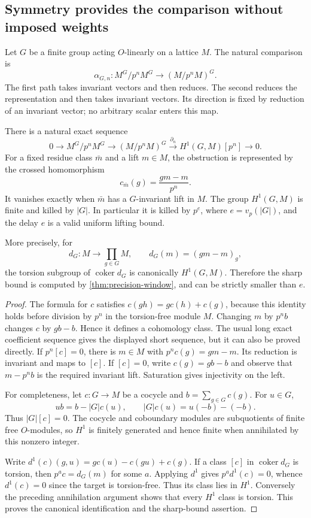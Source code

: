 \subsection{Symmetry provides the comparison without imposed weights}

Let $G$ be a finite group acting $O$-linearly on a lattice $M$. The natural comparison is
\[
 \alpha_{G,n}:M^G/p^nM^G\longrightarrow(M/p^nM)^G.
\]
The first path takes invariant vectors and then reduces. The second reduces the representation and then takes invariant vectors. Its direction is fixed by reduction of an invariant vector; no arbitrary scalar enters this map.

\begin{theorem}\label{thm:invariant-bockstein}
There is a natural exact sequence
\[
 \boxed{0\longrightarrow M^G/p^nM^G\longrightarrow(M/p^nM)^G
 \xrightarrow{\partial_n}H^1(G,M)[p^n]\longrightarrow0.}
\]
For a fixed residue class $\bar m$ and a lift $m\in M$, the obstruction is represented by the crossed homomorphism
\[
 c_{\bar m}(g)=\frac{gm-m}{p^n}.
\]
It vanishes exactly when $\bar m$ has a $G$-invariant lift in $M$. The group $H^1(G,M)$ is finite and killed by $|G|$. In particular it is killed by $p^e$, where $e=v_p(|G|)$, and the delay $e$ is a valid uniform lifting bound.

More precisely, for
\[
 d_G:M\longrightarrow\prod_{g\in G}M,\qquad
 d_G(m)=(gm-m)_g,
\]
the torsion subgroup of $\operatorname{coker}d_G$ is canonically $H^1(G,M)$. Therefore the sharp bound is computed by \cref{thm:precision-window}, and can be strictly smaller than $e$.
\end{theorem}
\begin{proof}
The formula for $c$ satisfies $c(gh)=g c(h)+c(g)$, because this identity holds before division by $p^n$ in the torsion-free module $M$. Changing $m$ by $p^n b$ changes $c$ by $g b-b$. Hence it defines a cohomology class. The usual long exact coefficient sequence gives the displayed short sequence, but it can also be proved directly. If $p^n[c]=0$, there is $m\in M$ with $p^n c(g)=gm-m$. Its reduction is invariant and maps to $[c]$. If $[c]=0$, write $c(g)=g b-b$ and observe that $m-p^n b$ is the required invariant lift. Saturation gives injectivity on the left.

For completeness, let $c:G\to M$ be a cocycle and $b=\sum_{g\in G}c(g)$. For $u\in G$,
\[
 ub=b-|G|c(u),\qquad |G|c(u)=u(-b)-(-b).
\]
Thus $|G|[c]=0$. The cocycle and coboundary modules are subquotients of finite free $O$-modules, so $H^1$ is finitely generated and hence finite when annihilated by this nonzero integer.

Write $d^1(c)(g,u)=g c(u)-c(gu)+c(g)$. If a class $[c]$ in $\operatorname{coker}d_G$ is torsion, then $p^a c=d_G(m)$ for some $a$. Applying $d^1$ gives $p^a d^1(c)=0$, whence $d^1(c)=0$ since the target is torsion-free. Thus its class lies in $H^1$. Conversely the preceding annihilation argument shows that every $H^1$ class is torsion. This proves the canonical identification and the sharp-bound assertion.
\end{proof}

